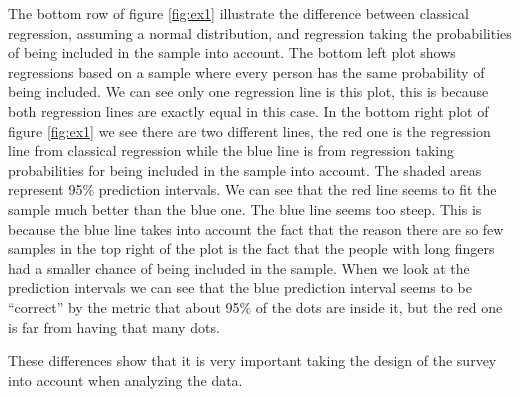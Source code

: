 \documentclass{article}
\begin{document}
\begin{example}
\begin{figure}
\end{figure}


The bottom row of figure \ref{fig:ex1} illustrate the difference between
classical regression, assuming a normal distribution, and regression taking the probabilities of being included
in the sample into account. The bottom left plot shows regressions based on a
sample where every person has the same probability of being included. We can see
only one regression line is this plot, this is because both regression lines are
exactly equal in this case. In the bottom right plot of figure \ref{fig:ex1} we
see there are two different lines, the red one is the regression line from
classical regression while the blue line is from regression taking probabilities
for being included in the sample into account. The shaded areas represent 95\%
prediction intervals. We can see that the red line seems to fit the sample much
better than the blue one. The blue line seems too steep. This is because the
blue line takes into account the fact that the reason there are so few samples
in the top right of the plot is the fact that the people with long fingers had a
smaller chance of being included in the sample. When we look at the prediction
intervals we can see that the blue prediction interval seems to be ``correct''
by the metric that about 95\% of the dots are inside it, but the red one is far
from having that many dots.

These differences show that it is very important taking the design of the survey
into account when analyzing the data.


\end{example}
\end{document}
